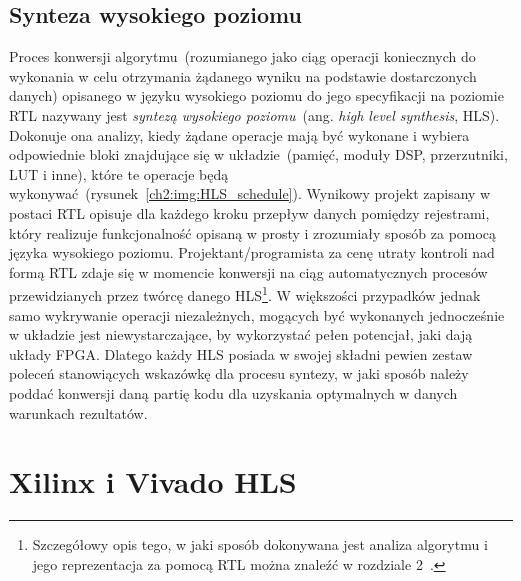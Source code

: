\subsection{Synteza wysokiego poziomu}
Proces konwersji algorytmu~(rozumianego jako ciąg operacji koniecznych do wykonania w celu otrzymania żądanego wyniku na podstawie dostarczonych danych) opisanego w języku wysokiego poziomu do jego specyfikacji na poziomie RTL nazywany jest \textit{syntezą wysokiego poziomu}~(ang. \textit{high level synthesis}, HLS). Dokonuje ona analizy, kiedy żądane operacje mają być wykonane i wybiera odpowiednie bloki znajdujące się w układzie~(pamięć, moduły DSP, przerzutniki, LUT i inne), które te operacje będą wykonywać~(rysunek~\ref{ch2:img:HLS_schedule}). 
Wynikowy projekt zapisany w postaci RTL opisuje dla każdego kroku przepływ danych pomiędzy rejestrami, który realizuje funkcjonalność opisaną w prosty i zrozumiały sposób za pomocą języka wysokiego poziomu. Projektant/programista za cenę utraty kontroli nad formą RTL zdaje się w momencie konwersji na ciąg automatycznych procesów przewidzianych przez twórcę danego HLS\footnote{Szczegółowy opis tego, w jaki sposób dokonywana jest analiza algorytmu i jego reprezentacja za pomocą RTL można znaleźć w rozdziale 2~\cite{FPGA_SD}.}. W większości przypadków jednak samo wykrywanie operacji niezależnych, mogących być wykonanych jednocześnie w układzie jest niewystarczające, by wykorzystać pełen potencjał, jaki dają układy FPGA. Dlatego każdy HLS posiada w swojej składni pewien zestaw poleceń stanowiących wskazówkę dla procesu syntezy, w jaki sposób należy poddać konwersji daną partię kodu dla uzyskania optymalnych w danych warunkach rezultatów.

\section{Xilinx i Vivado HLS}


